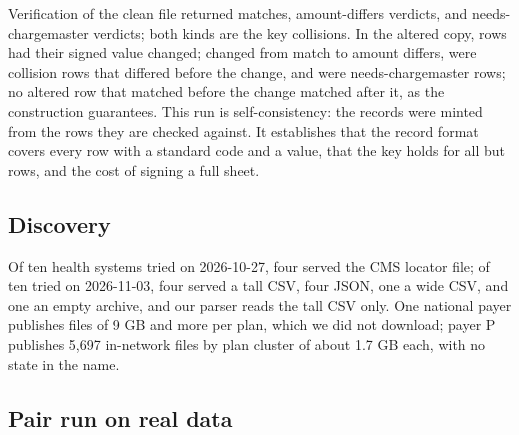 \documentclass[10pt]{article}
\begin{document}
Verification of the clean file returned \sheetCleanMatch{} matches, \sheetCleanDiffers{} amount-differs verdicts, and \sheetCleanNeedsCM{} needs-chargemaster verdicts; both kinds are the key collisions. In the altered copy, \sheetAltered{} rows had their signed value changed; \sheetCaught{} changed from match to amount differs, \sheetAlreadyDiffers{} were collision rows that differed before the change, and \sheetNotComparable{} were needs-chargemaster rows; no altered row that matched before the change matched after it, as the construction guarantees. This run is self-consistency: the records were minted from the rows they are checked against. It establishes that the record format covers every row with a standard code and a value, that the key holds for all but \sheetCollisions{} rows, and the cost of signing a full sheet.

\subsection*{Discovery}

Of ten health systems tried on 2026-10-27, four served the CMS locator file; of ten tried on 2026-11-03, four served a tall CSV, four JSON, one a wide CSV, and one an empty archive, and our parser reads the tall CSV only. One national payer publishes files of 9 GB and more per plan, which we did not download; payer P publishes 5,697 in-network files by plan cluster of about 1.7 GB each, with no state in the name.

\subsection*{Pair run on real data}
\end{document}
